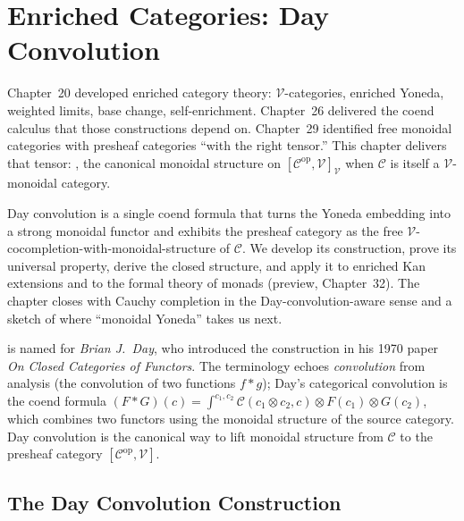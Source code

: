 
\chapter{Enriched Categories: Day Convolution}

\begin{overviewbox}
Chapter~20 developed enriched category theory: $\mathcal{V}$-categories,
enriched Yoneda, weighted limits, base change, self-enrichment. Chapter~26
delivered the coend calculus that those constructions depend on.
Chapter~29 identified free monoidal categories with presheaf categories
``with the right tensor.'' This chapter delivers that tensor: , the canonical monoidal structure on $[\mathcal{C}^{\mathrm{op}},
\mathcal{V}]_\mathcal{V}$ when $\mathcal{C}$ is itself a $\mathcal{V}$-monoidal
category.

Day convolution is a single coend formula that turns the Yoneda embedding
into a strong monoidal functor and exhibits the presheaf category as the
free $\mathcal{V}$-cocompletion-with-monoidal-structure of $\mathcal{C}$.
We develop its construction, prove its universal property, derive the
closed structure, and apply it to enriched Kan extensions and to the
formal theory of monads (preview, Chapter~32). The chapter closes with
Cauchy completion in the Day-convolution-aware sense and a sketch of
where ``monoidal Yoneda'' takes us next.
\end{overviewbox}


\begin{nameorigin}
 is named for \emph{Brian J.\ Day}, who
introduced the construction in his 1970 paper \emph{On Closed Categories
of Functors}. The terminology echoes \emph{convolution} from analysis
(the convolution of two functions $f * g$); Day's categorical
convolution is the coend formula
$(F * G)(c) = \int^{c_1, c_2} \mathcal{C}(c_1 \otimes c_2, c) \otimes
F(c_1) \otimes G(c_2)$,
which combines two functors using the monoidal structure of the source
category. Day convolution is the canonical way to lift monoidal
structure from $\mathcal{C}$ to the presheaf category
$[\mathcal{C}^{\mathrm{op}}, \mathcal{V}]$.
\end{nameorigin}

\section{The Day Convolution Construction}
\label{sec:day-convolution}


